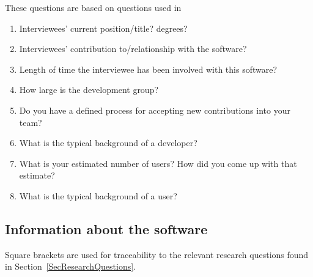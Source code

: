 \documentclass[letterpaper,cleveref]{lipics-v2019}
\begin{document}
These questions are based on questions used in \citet{Jegatheesan2016}

\begin{enumerate}
\item Interviewees' current position/title? degrees?
\item Interviewees' contribution to/relationship with the software?
\item Length of time the interviewee has been involved with this software?
\item How large is the development group?
\item Do you have a defined process for accepting new contributions into your team?
\item What is the typical background of a developer?
\item What is your estimated number of users? How did you come up with that estimate?
\item What is the typical background of a user?
\end{enumerate}

\subsection{Information about the software}

Square brackets are used for traceability to the  relevant research
questions found in Section~\ref{SecResearchQuestions}.
\end{document}
